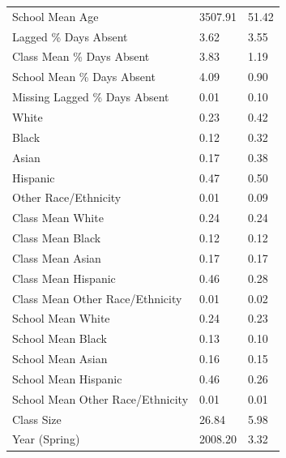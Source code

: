 \documentclass[12pt]{article}
\theoremstyle{definition}
\theoremstyle{definition}
\theoremstyle{definition}
\theoremstyle{definition}
\begin{document}
\begin{table}[]
\begin{tabular}{lll}
School Mean Age                                         & 3507.91 & 51.42     \\
Lagged \% Days Absent                                   & 3.62    & 3.55      \\
Class Mean \% Days Absent                               & 3.83    & 1.19      \\
School Mean \% Days Absent                              & 4.09    & 0.90      \\
Missing Lagged \% Days Absent                           & 0.01    & 0.10      \\
White                                                   & 0.23    & 0.42      \\
Black                                                   & 0.12    & 0.32      \\
Asian                                                   & 0.17    & 0.38      \\
Hispanic                                                & 0.47    & 0.50      \\
Other Race/Ethnicity                                    & 0.01    & 0.09      \\
Class Mean White                                        & 0.24    & 0.24      \\
Class Mean Black                                        & 0.12    & 0.12      \\
Class Mean Asian                                        & 0.17    & 0.17      \\
Class Mean Hispanic                                     & 0.46    & 0.28      \\
Class Mean Other   Race/Ethnicity                       & 0.01    & 0.02      \\
School Mean White                                       & 0.24    & 0.23      \\
School Mean Black                                       & 0.13    & 0.10      \\
School Mean Asian                                       & 0.16    & 0.15      \\
School Mean Hispanic                                    & 0.46    & 0.26      \\
School Mean Other   Race/Ethnicity                      & 0.01    & 0.01      \\
Class Size                                              & 26.84   & 5.98      \\
Year (Spring)                                           & 2008.20 & 3.32      \\

\end{tabular}
\end{table}
\end{document}
